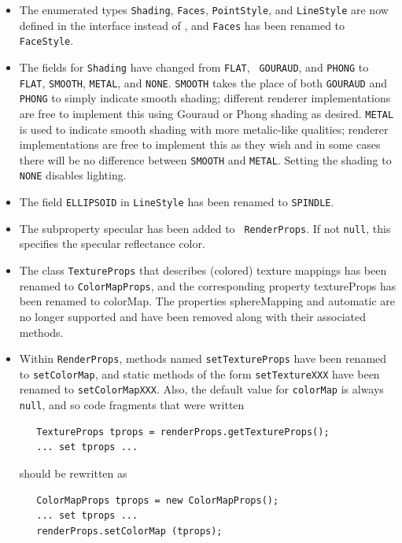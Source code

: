 \documentclass{article}
\begin{document}
\begin{itemize}

\item The enumerated types {\tt Shading}, {\tt Faces}, {\tt PointStyle}, and
{\tt LineStyle} are now defined in the interface
 instead of
, and {\tt Faces} has been
renamed to {\tt FaceStyle}.

\item The fields for {\tt Shading} have changed from {\tt FLAT}, {\tt
GOURAUD}, and {\tt PHONG} to {\tt FLAT}, {\tt SMOOTH}, {\tt METAL},
and {\tt NONE}. {\tt SMOOTH} takes the place of both {\tt GOURAUD} and
{\tt PHONG} to simply indicate smooth shading; different renderer
implementations are free to implement this using Gouraud or Phong
shading as desired. {\tt METAL} is used to indicate smooth shading
with more metalic-like qualities; renderer implementations are free to
implement this as they wish and in some cases there will be no
difference between {\tt SMOOTH} and {\tt METAL}. Setting the shading
to {\tt NONE} disables lighting.

\item The field {\tt ELLIPSOID} in {\tt LineStyle} has been renamed to
{\tt SPINDLE}.

\item The subproperty {\sf specular} has been added to {\tt
RenderProps}. If not {\tt null}, this specifies the specular
reflectance color.

\item The class {\tt TextureProps} that describes (colored) texture
mappings has been renamed to {\tt ColorMapProps}, and the
corresponding property {\sf textureProps} has been renamed to {\sf
colorMap}. The properties {\sf sphereMapping} and
{\sf automatic} are no longer supported and have been
removed along with their associated methods.

\item Within {\tt RenderProps}, methods named {\tt setTextureProps}
have been renamed to {\tt setColorMap}, and static methods of the form
{\tt setTextureXXX} have been renamed to {\tt setColorMapXXX}.
Also, the default value for {\tt colorMap} is always {\tt null},
and so code fragments that were written
\begin{verbatim}
   TextureProps tprops = renderProps.getTextureProps();
   ... set tprops ...
\end{verbatim}
should be rewritten as
\begin{verbatim}
   ColorMapProps tprops = new ColorMapProps();
   ... set tprops ...
   renderProps.setColorMap (tprops);
\end{verbatim}


\end{itemize}
\end{document}
